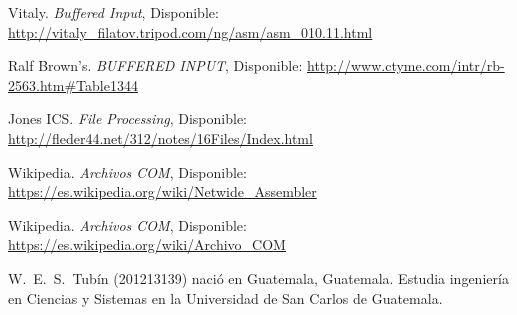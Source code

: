 \documentclass[journal]{../../IEEEtran/IEEEtran}
\begin{document}
\begin{thebibliography}{15}
  Vitaly. \emph{Buffered Input},
  Disponible:
  \url{http://vitaly_filatov.tripod.com/ng/asm/asm_010.11.html}

  Ralf Brown's. \emph{BUFFERED INPUT},
  Disponible:
  \url{http://www.ctyme.com/intr/rb-2563.htm#Table1344}
   
  
  Jones ICS. \emph{File Processing},
  Disponible:
  \url{http://fleder44.net/312/notes/16Files/Index.html}
  
  Wikipedia. \emph{Archivos COM},
  Disponible:
  \url{https://es.wikipedia.org/wiki/Netwide_Assembler}
  
  Wikipedia. \emph{Archivos COM},
  Disponible:
  \url{https://es.wikipedia.org/wiki/Archivo_COM}
  

  
\end{thebibliography}

% 


\begin{IEEEbiographynophoto}{W.~E.~S.~Tubín (201213139)}
nació en Guatemala, Guatemala. Estudia ingeniería en Ciencias y
Sistemas en la Universidad de San Carlos de Guatemala.
\end{IEEEbiographynophoto}





\vfill




\end{document}
